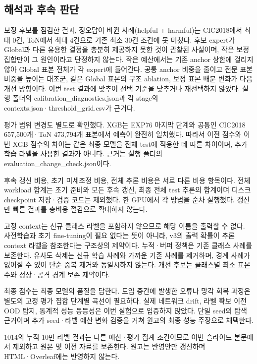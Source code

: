 \subsection{해석과 후속 판단}
보정 후보를 점검한 결과, 정오답이 바뀐 사례(helpful +\allowbreak{} harmful)는 CIC2018에서 최대 0건, ToN에서 최대 4건으로 기존 최소 30건 조건에 못 미쳤다. 후보 expert가 Global과 다른 유용한 결정을 충분히 제공하지 못한 것이 관찰된 사실이며, 작은 보정 집합만이 그 원인이라고 단정하지 않는다. 작은 예산에서는 기존 anchor 상한에 걸리지 않아 Global 표본 전체가 각 expert에 들어간다. 공통 anchor 비중을 줄이고 전문 표본 비중을 높이는 대조군, 같은 Global 표본의 구조 ablation, 보정 표본 배분 변화가 다음 개선 방향이다. 이번 test 결과에 맞추어 선택 기준을 낮추거나 재선택하지 않았다. 실행 폴더의 calibration\_\allowbreak{}diagnostics.json과 각 stage의 contexts.json·threshold\_\allowbreak{}grid.csv가 근거다.

평가 범위 변경도 별도로 확인했다. XGB는 EXP76 마지막 단계와 공통인 CIC2018 657,500개·ToN 473,794개 표본에서 예측이 완전히 일치했다. 따라서 이전 점수와 이번 XGB 점수의 차이는 같은 최종 모델을 전체 test에 적용한 데 따른 차이이며, 추가 학습 라벨을 사용한 결과가 아니다. 근거는 실행 폴더의 evaluation\_\allowbreak{}change\_\allowbreak{}check.json이다.

후속 갱신 비용, 초기 미세조정 비용, 전체 추론 비용은 서로 다른 비용 항목이다. 전체 workload 합계는 초기 준비와 모든 후속 갱신, 최종 전체 test 추론의 합계이며 디스크 checkpoint 저장·검증 코드는 제외했다. 한 GPU에서 각 방법을 순차 실행했다. 갱신만 빠른 결과를 총비용 절감으로 확대하지 않는다.

고정 context는 신규 클래스 라벨을 포함하지 않으므로 해당 이름을 출력할 수 없다. 사전학습과 초기 fine-tuning이 필요 없다는 뜻이 아니라, v3의 출력 확률이 추론 context 라벨을 참조한다는 구조상의 제약이다. 누적·버퍼 정책은 기존 클래스 사례를 보존한다. 유사도 삭제는 신규 학습 사례와 가까운 기존 사례를 제거하며, 경계 사례가 없어질 수 있어 단순 중복 제거와 동일시하지 않는다. 개선 후보는 클래스별 최소 표본 수와 정상·공격 경계 보존 제약이다.

최종 점수는 최종 모델의 품질을 답한다. 도입 중간에 발생한 오류나 망각 회복 과정은 별도의 고정 평가 집합 단계별 곡선이 필요하다. 실제 네트워크 drift, 라벨 확보 이전 OOD 탐지, 통계적 성능 동등성은 이번 실험으로 입증하지 않았다. 단일 seed의 탐색 근거이며 추가 seed·라벨 예산 변화 검증을 거쳐 원고의 최종 성능 주장으로 채택한다.

1014의 누적 10만 라벨 결과는 다른 예산·평가 집계 조건이므로 이번 슬라이드 본문에서 제외하고 원본 및 이전 자료를 보존한다. 원고는 반영안만 갱신하며 HTML·Overleaf에는 반영하지 않는다.

